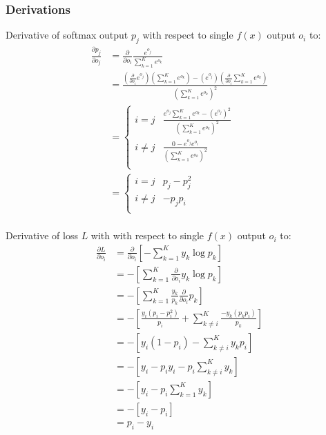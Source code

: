 

\subsubsection{Derivations}
Derivative of softmax output $p_j$ with respect to single $f(x)$ output $o_i$ to:\\
\begin{align*}
    \frac{\partial p_j}{\partial o_j} &= \frac{\partial}{\partial o_i} \frac{e^{o_j}}{\sum^K_{k=1} e^{o_k}} \\
    &= \frac{ (\frac{\partial}{\partial o_i} e^{o_j})(\sum^K_{k=1} e^{o_k}) - (e^{o_j})(\frac{\partial}{\partial o_i} \sum^K_{k=1} e^{o_k}) }{ (\sum^K_{k=1} e^{o_k})^2 }\\
    &= \begin{cases} i = j & \frac{ e^{o_j} \sum^K_{k=1}e^{o_k} - (e^{o_j})^2 }{ (\sum^K_{k=1}e^{o_k})^2 }\\ i \neq j & \frac{ 0 - e^{o_j}e^{o_i} }{ (\sum^K_{k=1}e^{o_k})^2 }\\ \end{cases}\\
    &= \begin{cases} i = j & p_j - p_j^2\\ i \neq j & -p_jp_i\\ \end{cases}\\
\end{align*}

Derivative of loss $L$ with with respect to single $f(x)$ output $o_i$ to:\\
\begin{align*}
    \frac{\partial L}{\partial o_i} &= \frac{\partial}{\partial o_i} \left[- \sum^K_{k=1} y_k \log p_k \right]\\
    &= - \left[\sum^K_{k=1} \frac{\partial}{\partial o_i} y_k \log p_k \right]\\
    &= - \left[\sum^K_{k=1} \frac{y_k}{p_k} \frac{\partial}{\partial o_i}  p_k \right]\\
    &= - \left[ \frac{y_i (p_i - p_i^2)}{p_i} + \sum^K_{k\neq i} \frac{-y_k(p_kp_i)}{p_k} \right]\\
    &= - \left[ y_i (1-p_i) - \sum^K_{k\neq i} y_k p_i \right]\\
    &= - \left[ y_i - p_iy_i - p_i\sum^K_{k\neq i} y_k \right]\\
    &= - \left[ y_i - p_i\sum^K_{k=1} y_k \right]\\
    &= - \left[ y_i - p_i \right]\\
    &=  p_i - y_i\\
\end{align*}
